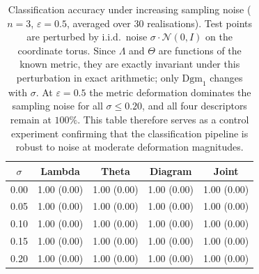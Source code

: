 \begin{table}[htbp]\centering
\caption{Classification accuracy under increasing sampling noise
(\(n=3\), \(\varepsilon=0.5\), averaged over 30 realisations). Test points
are perturbed by i.i.d.\ noise \(\sigma\cdot\mathcal{N}(0,I)\) on the
coordinate torus. Since \(\Lambda\) and \(\Theta\) are functions of the known
metric, they are exactly invariant under this perturbation in exact
arithmetic; only \(\mathrm{Dgm}_1\) changes with \(\sigma\). At
\(\varepsilon=0.5\) the metric deformation dominates the sampling noise for
all \(\sigma\le 0.20\), and all four descriptors remain at \(100\%\). This
table therefore serves as a control experiment confirming that the
classification pipeline is robust to noise at moderate deformation
magnitudes.}
\label{tab:noise-robustness}
\begin{tabular}{c|cccc}\hline
\(\sigma\) & Lambda & Theta & Diagram & Joint \\\hline
0.00 & 1.00 (0.00) & 1.00 (0.00) & 1.00 (0.00) & 1.00 (0.00) \\
0.05 & 1.00 (0.00) & 1.00 (0.00) & 1.00 (0.00) & 1.00 (0.00) \\
0.10 & 1.00 (0.00) & 1.00 (0.00) & 1.00 (0.00) & 1.00 (0.00) \\
0.15 & 1.00 (0.00) & 1.00 (0.00) & 1.00 (0.00) & 1.00 (0.00) \\
0.20 & 1.00 (0.00) & 1.00 (0.00) & 1.00 (0.00) & 1.00 (0.00) \\
\hline\end{tabular}\end{table}